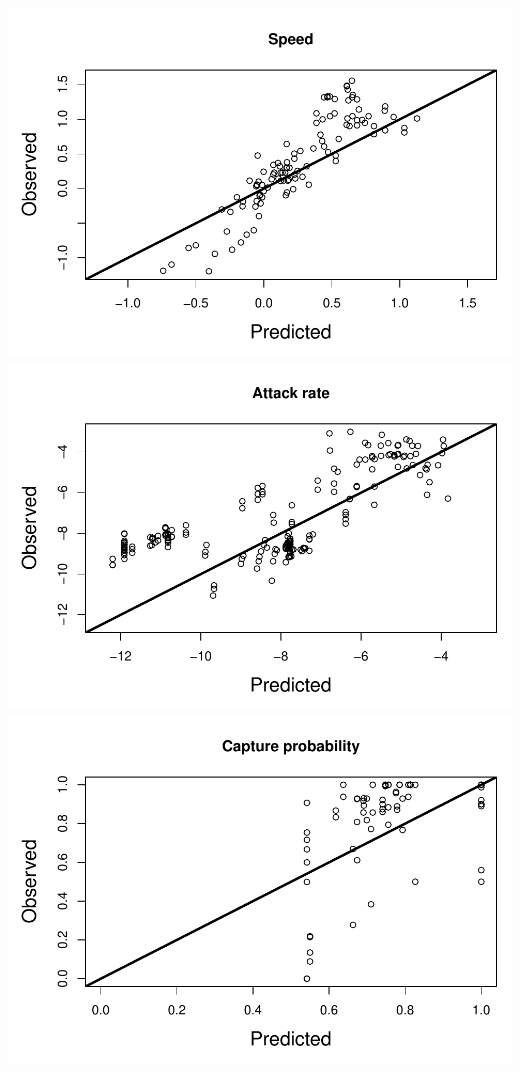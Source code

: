 \includegraphics{Model_Fit_files/figure-latex/unnamed-chunk-7-1.pdf}
\includegraphics{Model_Fit_files/figure-latex/unnamed-chunk-7-2.pdf}
\includegraphics{Model_Fit_files/figure-latex/unnamed-chunk-7-3.pdf}
